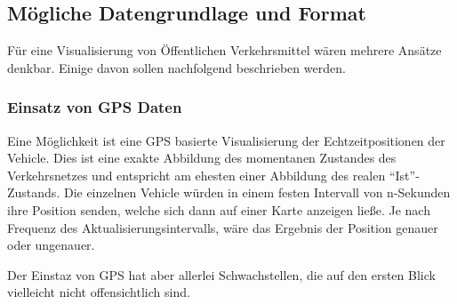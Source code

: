 \subsection{Mögliche Datengrundlage und Format}
\label{sub:mögliche_datengrundlage_und_format}
  Für eine Visualisierung von Öffentlichen Verkehrsmittel wären mehrere Ansätze denkbar. Einige davon sollen nachfolgend beschrieben werden.

  \subsubsection{Einsatz von GPS Daten}
  \label{ssub:einsatz_von_gps_daten}
    Eine Möglichkeit ist eine GPS basierte Visualisierung der Echtzeitpositionen der Vehicle. Dies ist eine exakte Abbildung des momentanen Zustandes des Verkehrsnetzes und entspricht am ehesten einer Abbildung des realen "`Ist"'-Zustands. Die einzelnen Vehicle würden in einem festen Intervall von n-Sekunden ihre Position senden, welche sich dann auf einer Karte anzeigen ließe. Je nach Frequenz des Aktualisierungsintervalls, wäre das Ergebnis der Position genauer oder ungenauer.

    Der Einstaz von GPS hat aber allerlei Schwachstellen, die auf den ersten Blick vielleicht nicht offensichtlich sind.

